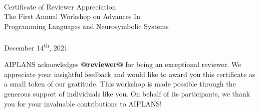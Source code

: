\documentclass[12pt,landscape]{article}
\begin{document}
	\pagestyle{empty}

	~
	\vskip 1.17cm

	\begin{center}
	{ \sc \color{titlecolor} Certificate of Reviewer Appreciation}\\[20pt]
	{ \sc \color{subtitlecolor} The First Annual Workshop on Advances In}\\[10pt]
	{ \sc \color{subtitlecolor}Programming Languages and Neurosymbolic Systems}\\[10pt]
	\\
	{ \sc \color{subtitlecolor} December 14\textsuperscript{th}, 2021}\\
	\end{center}

	\vskip 0.7cm

	\hskip 10pt
	\begin{center}
		\begin{minipage}{0.72\textwidth}

			AIPLANS acknowledges \textbf{@reviewer@} for being an exceptional reviewer. We appreciate your insightful feedback and would like to award you this certificate as a small token of our gratitude. This workshop is made possible through the generous support of individuals like you. On behalf of its participants, we thank you for your invaluable contributions to AIPLANS!

		\end{minipage}
	\end{center}
\end{document}
